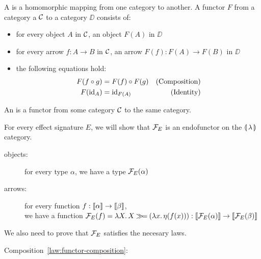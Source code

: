 \begin{definition}
A  is a homomorphic mapping from one category to
another. A functor $F$ from a category a $\mathcal{C}$ to a category $\DD$
consists of:
\begin{itemize}
\item for every object $A$ in $\mathcal{C}$, an object $F(A)$ in $\DD$
\item for every arrow $f : A \to B$ in $\mathcal{C}$, an arrow $F(f) : F(A) \to
  F(B)$ in $\DD$
\item the following equations hold:
  \begin{align}
    \label{law:functor-composition}F(f \circ g) &= F(f) \circ F(g) & \text{(Composition)} \\
    \label{law:functor-identity}F(\mathrm{id}_A) &= \mathrm{id}_{F(A)} & \text{(Identity)}
  \end{align}
\end{itemize}
\end{definition}

\begin{definition}
  An  is a functor from some category $\mathcal{C}$ to the same
  category.
\end{definition}

For every effect signature $E$, we will show that $\mathcal{F}_E$ is an endofunctor
on the $\llparenthesis \, \lambda \, \rrparenthesis$ category.
\begin{description}
\item[objects:] for every type $\alpha$, we have a type $\mathcal{F}_E(\alpha)$
\item[arrows:] for every function $f : \llbracket \alpha \rrbracket \to \llbracket \beta \rrbracket$, \\ we
  have a function
  $\mathcal{F}_E(f) = \lambda X.\, X \mathbin{\gg\!=} (\lambda x.\, \eta(f(x))) :
  \llbracket \mathcal{F}_E(\alpha) \rrbracket \to \llbracket \mathcal{F}_E(\beta) \rrbracket$
\end{description}

We also need to prove that $\mathcal{F}_E$ satisfies the necesary laws.

Composition~\eqref{law:functor-composition}:

